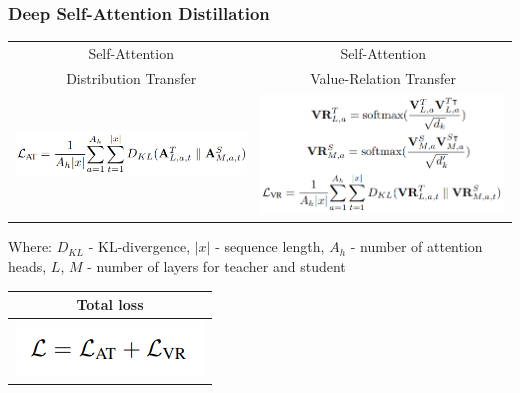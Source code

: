 \documentclass{beamer}
\begin{document}
\begin{frame}
    \frametitle{Deep Self-Attention Distillation}
    \begin{table}[]
    \begin{tabular}{|c|c|}
    \hline
    Self-Attention & Self-Attention \\
    Distribution Transfer & Value-Relation Transfer \\
    \hline
    \includegraphics[scale=0.285]{img/mini_lm_self_attention_loss.png} & \includegraphics[scale=0.285]{img/mini_lm_values_loss.png} \\
    \hline
    \end{tabular}
    \end{table}
    \tiny Where: $ D_{KL} $ - KL-divergence, $ |x| $ - sequence length,  $ A_h $ - number of attention heads, $L$, $M$ - number of layers for teacher and student

    \normalsize
    \begin{table}[]
    \begin{tabular}{|c|}
    \hline
    Total loss \\
    \hline
    \includegraphics[scale=0.285]{img/mini_lm_total_loss.png} \\
    \hline
    \end{tabular}
    \end{table}
\end{frame}
\end{document}
